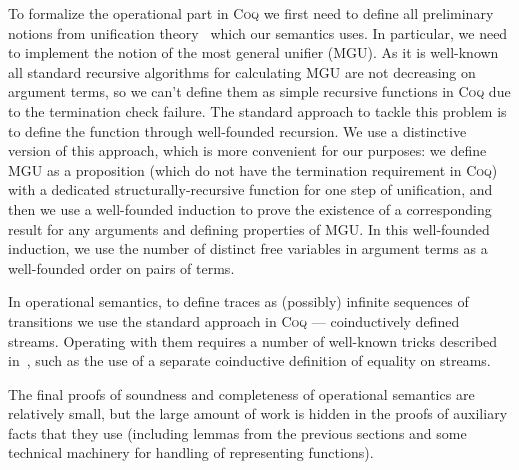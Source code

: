 To formalize the operational part in \textsc{Coq} we first need to define all preliminary notions from unification theory~\cite{Unification} which our semantics uses. In particular, we need to implement the notion of the most general unifier (MGU). As it is well-known~\cite{StructuralMGU} all standard recursive algorithms for calculating MGU are not decreasing on argument terms, so we can't define them as simple recursive functions in \textsc{Coq} due to the termination check failure. The standard approach to tackle this problem is to define the function through well-founded recursion. We use a distinctive version of this approach, which is more convenient for our purposes: we define MGU as a proposition (which do not have the termination requirement in \textsc{Coq}) with a dedicated structurally-recursive function for one step of unification, and then we use a well-founded induction to prove the existence of a corresponding result for any arguments and defining properties of MGU. In this well-founded induction, we use the number of distinct free variables in argument terms as a well-founded order on pairs of terms.

In operational semantics, to define traces as (possibly) infinite sequences of transitions we use the standard approach in \textsc{Coq} — coinductively defined streams. Operating with them requires a number of well-known tricks described in~\cite{CPDT}, such as the use of a separate coinductive definition of equality on streams.

The final proofs of soundness and completeness of operational semantics are relatively small, but the large amount of work is hidden in the proofs of auxiliary facts that they use (including lemmas from the previous sections and some technical machinery for handling of representing functions).
